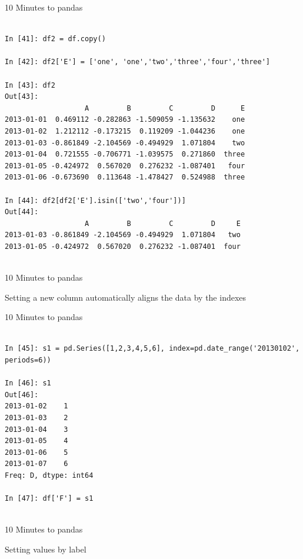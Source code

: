 \documentclass{beamer}
\begin{document}
\begin{frame}[t,fragile]{10 Minutes to pandas}


	\scriptsize
\begin{verbatim}

In [41]: df2 = df.copy()

In [42]: df2['E'] = ['one', 'one','two','three','four','three']

In [43]: df2
Out[43]: 
                   A         B         C         D      E
2013-01-01  0.469112 -0.282863 -1.509059 -1.135632    one
2013-01-02  1.212112 -0.173215  0.119209 -1.044236    one
2013-01-03 -0.861849 -2.104569 -0.494929  1.071804    two
2013-01-04  0.721555 -0.706771 -1.039575  0.271860  three
2013-01-05 -0.424972  0.567020  0.276232 -1.087401   four
2013-01-06 -0.673690  0.113648 -1.478427  0.524988  three

In [44]: df2[df2['E'].isin(['two','four'])]
Out[44]: 
                   A         B         C         D     E
2013-01-03 -0.861849 -2.104569 -0.494929  1.071804   two
2013-01-05 -0.424972  0.567020  0.276232 -1.087401  four


\end{verbatim}


\end{frame}


\begin{frame}[t]{10 Minutes to pandas}

Setting a new column automatically aligns the data
by the indexes

\end{frame}


\begin{frame}[t,fragile]{10 Minutes to pandas}


	\scriptsize
\begin{verbatim}

In [45]: s1 = pd.Series([1,2,3,4,5,6], index=pd.date_range('20130102', periods=6))

In [46]: s1
Out[46]: 
2013-01-02    1
2013-01-03    2
2013-01-04    3
2013-01-05    4
2013-01-06    5
2013-01-07    6
Freq: D, dtype: int64

In [47]: df['F'] = s1


\end{verbatim}


\end{frame}


\begin{frame}[t]{10 Minutes to pandas}

Setting values by label

\end{frame}
\end{document}
